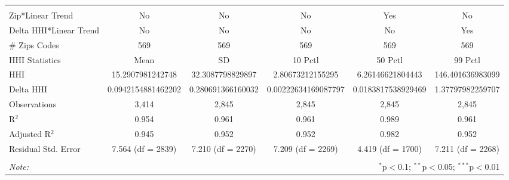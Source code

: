\begin{table}[H]
{\begin{tabular}{@{\extracolsep{5pt}}lccccc}
   & & & & & \\  

 \hline \\[-1.8ex]  

 Zip*Linear Trend & No & No & No & Yes & No \\  

 Delta HHI*Linear Trend & No & No & No & No & Yes \\  

 # Zips Codes & 569 & 569 & 569 & 569 & 569 \\  

 HHI Statistics & Mean & SD & 10 Pctl & 50 Pctl & 99 Pctl \\  

 HHI & 15.2907981242748 & 32.3087798829897 & 2.80673212155295 & 6.26146621804443 & 146.401636983099 \\  

 Delta HHI & 0.0942154881462202 & 0.280691366160032 & 0.00222634169087797 & 0.0183817538929469 & 1.37797982259707 \\  

 Observations & 3,414 & 2,845 & 2,845 & 2,845 & 2,845 \\  

 R$^{2}$ & 0.954 & 0.961 & 0.961 & 0.989 & 0.961 \\  

 Adjusted R$^{2}$ & 0.945 & 0.952 & 0.952 & 0.982 & 0.952 \\  

 Residual Std. Error & 7.564 (df = 2839) & 7.210 (df = 2270) & 7.209 (df = 2269) & 4.419 (df = 1700) & 7.211 (df = 2268) \\  

 \hline  

 \hline \\[-1.8ex]  

 \textit{Note:}  & \multicolumn{5}{r}{$^{*}$p$<$0.1; $^{**}$p$<$0.05; $^{***}$p$<$0.01} \\  

 \end{tabular}}  

 \end{table}  

 



